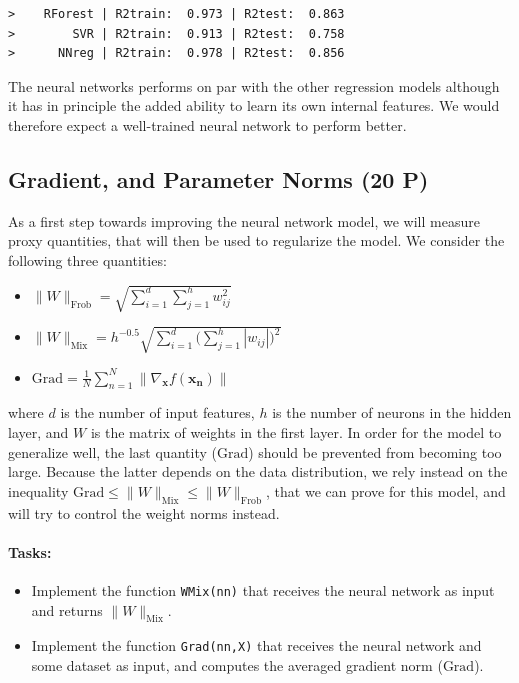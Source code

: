 \documentclass[10pt]{article}
\providecommand{\tightlist}{%
      \setlength{\itemsep}{0pt}\setlength{\parskip}{0pt}}
\begin{document}
    \begin{Verbatim}[commandchars=\\\{\}]
>    RForest | R2train:  0.973 | R2test:  0.863
>        SVR | R2train:  0.913 | R2test:  0.758
>      NNreg | R2train:  0.978 | R2test:  0.856

    \end{Verbatim}

    The neural networks performs on par with the other regression models
although it has in principle the added ability to learn its own internal
features. We would therefore expect a well-trained neural network to
perform better.

\subsection{Gradient, and Parameter Norms (20
P)}\label{gradient-and-parameter-norms-20-p}

As a first step towards improving the neural network model, we will
measure proxy quantities, that will then be used to regularize the
model. We consider the following three quantities:

\begin{itemize}
\tightlist
\item
  \(\|W\|_\text{Frob} = \sqrt{\sum_{i=1}^d \sum_{j=1}^h w_{ij}^2}\)
\item
  \(\|W\|_\text{Mix} = h^{-0.5} \sqrt{\sum_{i=1}^d \big(\sum_{j=1}^h | w_{ij}|\big)^2}\)
\item
  \(\text{Grad} = \textstyle \frac1N \sum_{n=1}^N\|\nabla_{\boldsymbol{x}}f (\boldsymbol{x_n})\|\)
\end{itemize}

where \(d\) is the number of input features, \(h\) is the number of
neurons in the hidden layer, and \(W\) is the matrix of weights in the
first layer. In order for the model to generalize well, the last
quantity (\(\text{Grad}\)) should be prevented from becoming too large.
Because the latter depends on the data distribution, we rely instead on
the inequality
\(\text{Grad} \leq \|W\|_\text{Mix} \leq \|W\|_\text{Frob}\), that we
can prove for this model, and will try to control the weight norms
instead.

\paragraph{Tasks:}\label{tasks}

\begin{itemize}
\tightlist
\item
  Implement the function \texttt{WMix(nn)} that receives the neural
  network as input and returns \(\|W\|_\text{Mix}\).
\item
  Implement the function \texttt{Grad(nn,X)} that receives the neural
  network and some dataset as input, and computes the averaged gradient
  norm (\(\text{Grad}\)).
\end{itemize}
\end{document}
